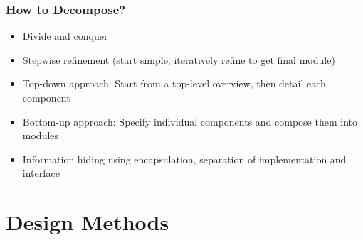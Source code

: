 \documentclass{article}
\begin{document}
\subsubsection{How to Decompose?}
\begin{itemize}
    \item Divide and conquer
    
    \item Stepwise refinement (start simple, iteratively refine to get final module)
    
    \item Top-down approach: Start from a top-level overview, then detail each component
    
    \item Bottom-up approach: Specify individual components and compose them into modules
    
    \item Information hiding using encapsulation, separation of implementation and interface
\end{itemize}

\section{Design Methods}
\end{document}
